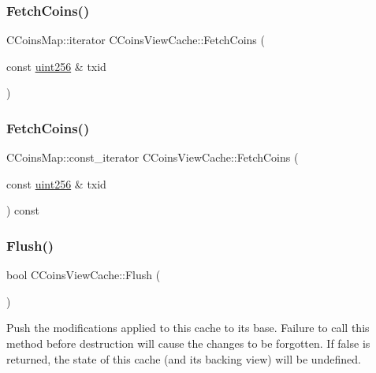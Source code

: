 \subsubsection{\texorpdfstring{Fetch\+Coins()}{FetchCoins()}\hspace{0.1cm}{\footnotesize\ttfamily [1/2]}}
{\footnotesize\ttfamily C\+Coins\+Map\+::iterator C\+Coins\+View\+Cache\+::\+Fetch\+Coins (\begin{DoxyParamCaption}\item[{const \mbox{\hyperlink{classuint256}{uint256}} \&}]{txid }\end{DoxyParamCaption})\hspace{0.3cm}{\ttfamily [private]}}

\mbox{\label{class_c_coins_view_cache_a964e8bc4a5f8131eab430d356a25fc6d}} 
\subsubsection{\texorpdfstring{Fetch\+Coins()}{FetchCoins()}\hspace{0.1cm}{\footnotesize\ttfamily [2/2]}}
{\footnotesize\ttfamily C\+Coins\+Map\+::const\+\_\+iterator C\+Coins\+View\+Cache\+::\+Fetch\+Coins (\begin{DoxyParamCaption}\item[{const \mbox{\hyperlink{classuint256}{uint256}} \&}]{txid }\end{DoxyParamCaption}) const\hspace{0.3cm}{\ttfamily [private]}}

\mbox{\label{class_c_coins_view_cache_ac9888d4feaa46666d03871cd7cd1c01d}} 
\subsubsection{\texorpdfstring{Flush()}{Flush()}}
{\footnotesize\ttfamily bool C\+Coins\+View\+Cache\+::\+Flush (\begin{DoxyParamCaption}{ }\end{DoxyParamCaption})}

Push the modifications applied to this cache to its base. Failure to call this method before destruction will cause the changes to be forgotten. If false is returned, the state of this cache (and its backing view) will be undefined. \mbox{\label{class_c_coins_view_cache_a97401da3be42b24b16fc202cdce34419}} 
